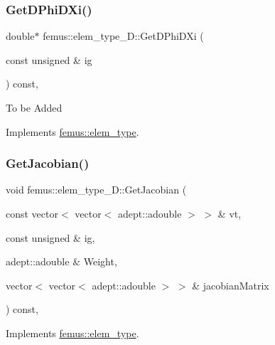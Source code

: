 \subsubsection{\texorpdfstring{Get\+D\+Phi\+D\+Xi()}{GetDPhiDXi()}}
{\footnotesize\ttfamily double$\ast$ femus\+::elem\+\_\+type\+\_\+D\+::\+Get\+D\+Phi\+D\+Xi (\begin{DoxyParamCaption}\item[{const unsigned \&}]{ig }\end{DoxyParamCaption}) const\hspace{0.3cm}{\ttfamily [inline]}, {\ttfamily [virtual]}}

To be Added 

Implements \mbox{\hyperlink{classfemus_1_1elem__type_a6efb6026b9fe89912ec367b235bfccc7}{femus\+::elem\+\_\+type}}.

\mbox{\label{classfemus_1_1elem__type__2_d_a0cd4c80b3b6323d3ab4a57a29ad41034}} 
\subsubsection{\texorpdfstring{Get\+Jacobian()}{GetJacobian()}\hspace{0.1cm}{\footnotesize\ttfamily [1/2]}}
{\footnotesize\ttfamily void femus\+::elem\+\_\+type\+\_\+D\+::\+Get\+Jacobian (\begin{DoxyParamCaption}\item[{const vector$<$ vector$<$ adept\+::adouble $>$ $>$ \&}]{vt,  }\item[{const unsigned \&}]{ig,  }\item[{adept\+::adouble \&}]{Weight,  }\item[{vector$<$ vector$<$ adept\+::adouble $>$ $>$ \&}]{jacobian\+Matrix }\end{DoxyParamCaption}) const\hspace{0.3cm}{\ttfamily [inline]}, {\ttfamily [virtual]}}



Implements \mbox{\hyperlink{classfemus_1_1elem__type_aa8e617c54dd774ffca5d305605552af7}{femus\+::elem\+\_\+type}}.

\mbox{\label{classfemus_1_1elem__type__2_d_ac1fe4b778f06a58de8ad7057fb982a4b}} 
